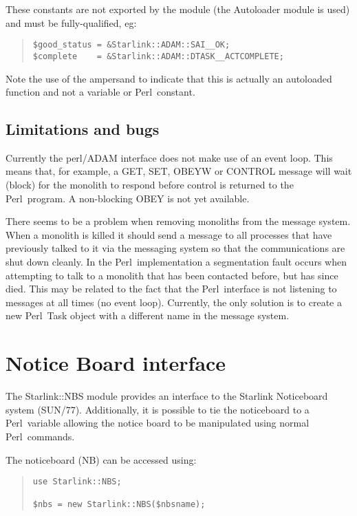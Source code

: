 \documentclass[twoside,11pt]{article}
\newenvironment{myquote}{\begin{quote}\begin{small}}{\end{small}\end{quote}}
\newcommand{\perl}{\xref{\textsf{Perl}}{sun193}{}}
\newcommand{\xref}[3]{#1}
\renewcommand{\_}{\texttt{\symbol{95}}}
\begin{document}
These constants are not exported by the module (the Autoloader module is used)
and must be fully-qualified, eg:

\begin{myquote}
\begin{verbatim}
$good_status = &Starlink::ADAM::SAI__OK;
$complete    = &Starlink::ADAM::DTASK__ACTCOMPLETE;
\end{verbatim}
\end{myquote}

Note the use of the ampersand to indicate that this is actually an
autoloaded function and not a variable or \perl\ constant.

\subsection{Limitations and bugs}

Currently the perl/ADAM interface does not make use of an event loop.
This means that, for example, a GET, SET, OBEYW or CONTROL message will
wait (block) for the monolith to respond before control is returned
to the \perl\ program. A non-blocking OBEY is not yet available.

There seems to be a problem when removing monoliths from the message
system. When a monolith is killed it should send a message to
all processes that have previously talked to it via the messaging
system so that the communications are shut down cleanly. In the \perl\
implementation a segmentation fault occurs when attempting to talk
to a monolith that has been contacted before, but has since died.
This may be related to the fact that the \perl\ interface is not
listening to messages at all times (no event loop). Currently, the
only solution is to create a new \perl\ Task object with a different
name in the message system.

\section{Notice Board interface}

The Starlink::NBS module provides an interface to the Starlink
Noticeboard system (\xref{SUN/77}{sun77}{}). Additionally, it is possible
to tie the noticeboard to a \perl\ variable allowing the notice board
to be manipulated using normal \perl\ commands.

The noticeboard (NB) can be accessed using:

\begin{myquote}
\begin{verbatim}
use Starlink::NBS;

$nbs = new Starlink::NBS($nbsname);
\end{verbatim}
\end{myquote}
\end{document}
